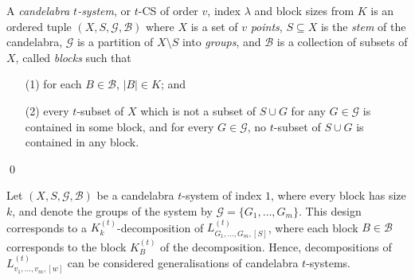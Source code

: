 \begin{definition}
A {\em candelabra $t$-system}, or $t$-CS of order $v$, index $\lambda$ and block sizes from $K$ is an ordered tuple $(X, S, \mathcal{G}, \mathcal{B})$ where $X$ is a set of $v$ {\em points}, $S \subseteq X$ is the {\em stem} of the candelabra, $\mathcal{G}$ is a partition of $X \setminus S$ into {\em groups}, and $\mathcal{B}$ is a collection of subsets of $X$, called {\em blocks} such that
\begin{enumerate}
    \item[(1)] for each $B \in \mathcal{B}$, $|B| \in K$; and
    \item[(2)] every $t$-subset of $X$ which is not a subset of $S \cup G$ for any $G \in \mathcal{G}$ is contained in some block, and for every $G \in \mathcal{G}$, no $t$-subset of $S \cup G$ is contained in any block.
\end{enumerate}
\qed
\end{definition}

Let $(X, S, \mathcal{G}, \mathcal{B})$ be a candelabra $t$-system of index $1$, where every block has size $k$, and denote the groups of the system by $\mathcal{G} = \{G_1, \ldots, G_m\}$.
This design corresponds to a $K_{k}^{(t)}$-decomposition of $L_{G_1,\ldots,G_m,[S]}^{(t)}$, where each block $B \in \mathcal{B}$ corresponds to the block $K_{B}^{(t)}$ of the decomposition.
Hence, decompositions of $L_{v_1, \ldots, v_m,[w]}^{(t)}$ can be considered generalisations of candelabra $t$-systems.
